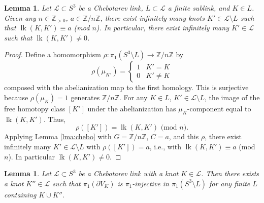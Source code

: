 \documentclass{amsart}
\theoremstyle{plain}
\theoremstyle{definition}
\theoremstyle{plain}
\theoremstyle{plain}
\theoremstyle{plain}
\newtheorem{lemma}[theorem]{Lemma}
\theoremstyle{remark}
\theoremstyle{remark}
\theoremstyle{plain}
\theoremstyle{definition}
\theoremstyle{plain}
\DeclareMathOperator{\lk}{\mathrm{lk}}
\theoremstyle{plain}
\theoremstyle{plain}
\numberwithin{equation}{section}
\begin{document}
\begin{lemma}\label{lma:linking}
Let $\mathcal{L} \subset S^3$ be a Chebotarev link, $L \subset \mathcal L$ a finite sublink, and $K \in L$. Given any $n \in \mathbb{Z}_{>0}$, $a \in \mathbb{Z}/n\mathbb{Z}$, there exist infinitely many knots $K' \in \mathcal{L} \setminus L$ such that $\lk(K, K') \equiv a$ (mod $n$). In particular, there exist infinitely many $K' \in \mathcal{L}$ such that $\lk(K, K') \neq 0$. 
\end{lemma}

\begin{proof}
Define a homomorphism $\rho: \pi_1(S^3 \setminus L) \to \mathbb{Z}/n\mathbb{Z}$ by 
\begin{equation}
    \rho(\mu_{K'}) = \begin{cases} 1 & K' = K \\ 0 & K' \neq K \end{cases}
\end{equation}
composed with the abelianization map to the first homology. This is surjective because $\rho(\mu_K) = 1$ generates $\mathbb{Z}/n\mathbb{Z}$. For any $K \in L$, $K' \in \mathcal{L} \setminus L$, the image of the free homotopy class $[K']$ under the abelianization has $\mu_K$-component equal to $\lk(K, K')$. Thus, 
\begin{equation}
    \rho([K']) = \lk(K, K') \text{ (mod $n$)}.
\end{equation}
Applying Lemma \ref{lma:chebo} with $G = \mathbb{Z}/n\mathbb{Z}$, $C = a$, and this $\rho$, there exist infinitely many $K' \in \mathcal{L} \setminus L$ with $\rho([K']) = a$, i.e., with $\lk(K, K') \equiv a$ (mod $n$). In particular $\lk(K, K') \neq 0$. 
\end{proof}

\begin{lemma}\label{lma:incompressible}
Let $\mathcal{L} \subset S^3$ be a Chebotarev link with a knot $K \in \mathcal{L}$. Then there exists a knot $K'' \in \mathcal{L}$ such that $\pi_1(\partial V_K)$ is $\pi_1$-injective in $\pi_1(S^3 \setminus L)$ for any finite $L$ containing $K \cup K''$.
\end{lemma}
\end{document}
